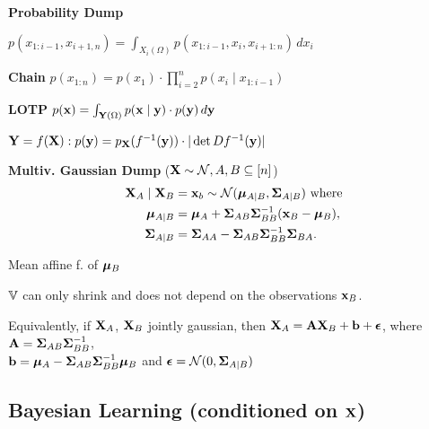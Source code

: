 \begin{colored}
    \textbf{Probability Dump}
    
    \begin{itemize*}
        \item \(p(x_{1:i-1}, x_{i+1,n}) = \int_{X_i(\Omega)}p(x_{1:i-1}, x_i, x_{i+1:n}) \,dx_i\)
        \item \textbf{Chain} \(p(x_{1:n}) = p(x_1)\cdot \prod_{i=2}^n p(x_i \mid x_{1:i-1})\) \\
        \item \textbf{LOTP} \(p(\vb{x}) = \int_{\vb{Y}(\Omega)} p(\vb{x} \mid \vb{y}) \cdot p(\vb{y}) \, d\vb{y}\) \\
        \item \(\vb{Y} = f(\vb{X}) : p(\vb{y}) = p_{\vb{X}}(f^{-1}(\vb{y})) \cdot |\det Df^{-1}(\vb{y})|\)
    \end{itemize*}
\end{colored}

\begin{colored}
    \textbf{\color{H3} Multiv. Gaussian Dump} (\(\vb{X} \sim \operatorname{\mathcal{N}}, A, B \subseteq [n]\))
    \begin{align*}
        \vb{X}_A \mid \vb{X}_B &= \vb{x}_b \sim \operatorname{\mathcal{N}} (\vb*{\mu}_{A \mid B}, \vb*{\Sigma}_{A \mid B}) \ \text{where} \\
        \vb*{\mu}_{A \mid B} &= \vb*{\mu}_A + \vb*{\Sigma}_{AB}\vb*{\Sigma}_{BB}^{-1}(\vb{x}_B - \vb*{\mu}_B),\\
        \vb*{\Sigma}_{A \mid B} &= \vb*{\Sigma}_{AA} - \vb*{\Sigma}_{AB}\vb*{\Sigma}_{BB}^{-1}\vb*{\Sigma}_{BA}.
    \end{align*}

    \begin{itemize*}
        \item Mean affine f. of \(\vb*{\mu}_B\)
        \item \(\operatorname{\mathbb{V}}\) can only shrink and does not depend on the observations \(\vb{x}_B\).
    \end{itemize*}

    Equivalently, if \(\vb{X}_A\), \(\vb{X}_B\) jointly gaussian, then
        \(\vb{X}_A = \vb{A}\vb{X}_B + \vb{b} + \vb*{\epsilon}\), where
        \(\vb{A} = \vb*{\Sigma}_{AB}\vb*{\Sigma}_{BB}^{-1}\), \\
        \(\vb{b} = \vb*{\mu}_A - \vb*{\Sigma}_{AB}\vb*{\Sigma}_{BB}^{-1}\vb*{\mu}_B\) and 
        \(\vb*{\epsilon} = \operatorname{\mathcal{N}}(0, \vb*{\Sigma}_{A \mid B})\)
\end{colored}

\subsection{Bayesian Learning (conditioned on \(\vb{X}\))}
\vspace{-8pt}

